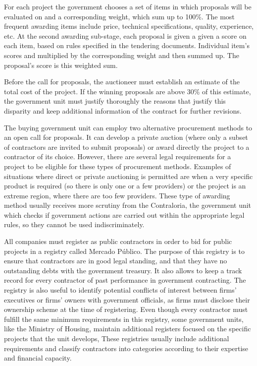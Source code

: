 For each project the government chooses a set of items in which proposals will be evaluated on and a corresponding weight, which sum up to 100\%. The most frequent awarding items include price, technical specifications, quality, experience, etc. At the second awarding sub-stage, each proposal is given a given a score on each item,  based on rules specified in the tendering documents. Individual item's scores and multiplied by the corresponding weight and then summed up. The proposal's score is this weighted sum.

Before the call for proposals, the auctioneer must establish an estimate of the total cost of the project. If the winning proposals are above 30\% of this estimate, the government unit must justify thoroughly the reasons that justify this disparity and keep additional information of the contract for further revisions.

The buying government unit can employ two alternative procurement methods to an open call for proposals. It can develop a private auction (where only a subset of contractors are invited to submit proposals) or award directly the project to a contractor of its choice. However, there are several legal requirements for a project to be eligible for these types of procurement methods. Examples of situations where direct or private auctioning is permitted are when a very specific product is required (so there is only one or a few providers) or the project is an extreme region, where there are too few providers. These type of awarding method usually receives more scrutiny from the Contraloria, the government unit which checks if government actions are carried out within the appropriate legal rules, so they cannot be used indiscriminately.

All companies must register as public contractors in order to bid for public projects in a registry called Mercado Público. The purpose of this registry is to ensure that contractors are in good legal standing, and that they have no outstanding debts with the government treasury. It also allows to keep a track record for every contractor of past performance in government contracting. The registry is also useful to identify potential conflicts of interest between firms' executives or firms' owners with government officials, as firms must disclose their ownership scheme at the time of registering. Even though every contractor must fulfill the same minimum requirements in this registry, some government units, like the Ministry of Housing, maintain additional registers focused on the specific projects that the unit develops, These registries usually include additional requirements and classify contractors into categories according to their expertise and financial capacity.

